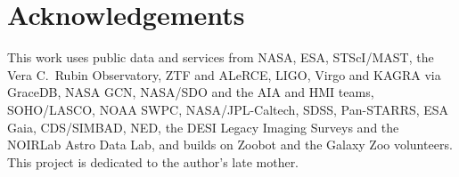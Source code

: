 \documentclass[preprint,11pt,authoryear]{elsarticle}
\begin{document}
\section*{Acknowledgements}

This work uses public data and services from NASA, ESA, STScI/MAST, the Vera C.\
Rubin Observatory, ZTF and ALeRCE, LIGO, Virgo and KAGRA via GraceDB, NASA GCN,
NASA/SDO and the AIA and HMI teams, SOHO/LASCO, NOAA SWPC, NASA/JPL-Caltech,
SDSS, Pan-STARRS, ESA Gaia, CDS/SIMBAD, NED, the DESI Legacy Imaging Surveys and
the NOIRLab Astro Data Lab, and builds on Zoobot and the Galaxy Zoo volunteers.
This project is dedicated to the author's late mother.



\end{document}
